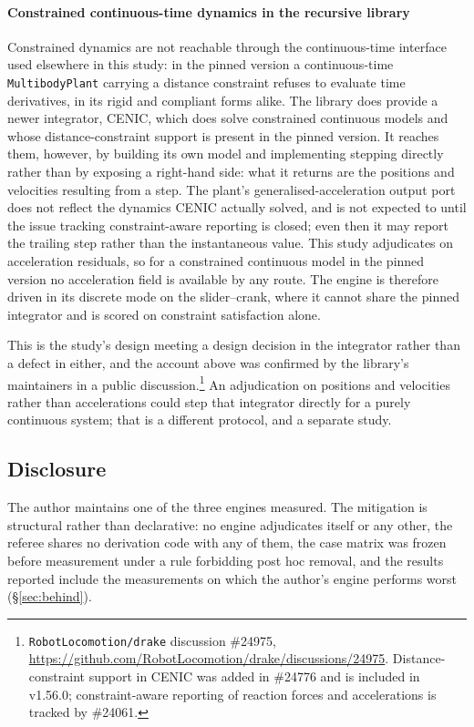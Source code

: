 \documentclass[review,12pt]{elsarticle}
\begin{document}
\paragraph{Constrained continuous-time dynamics in the recursive library}
Constrained dynamics are not reachable through the continuous-time interface
used elsewhere in this study: in the pinned version a continuous-time
\texttt{MultibodyPlant} carrying a distance constraint refuses to evaluate time
derivatives, in its rigid and compliant forms alike. The library does provide a
newer integrator, CENIC, which does solve constrained continuous models and
whose distance-constraint support is present in the pinned version. It reaches
them, however, by building its own model and implementing stepping directly
rather than by exposing a right-hand side: what it returns are the positions and
velocities resulting from a step. The plant's generalised-acceleration output
port does not reflect the dynamics CENIC actually solved, and is not expected to
until the issue tracking constraint-aware reporting is closed; even then it may
report the trailing step rather than the instantaneous value. This study
adjudicates on acceleration residuals, so for a constrained continuous model in
the pinned version no acceleration field is available by any route. The engine
is therefore driven in its discrete mode on the slider--crank, where it cannot
share the pinned integrator and is scored on constraint satisfaction alone.

This is the study's design meeting a design decision in the integrator rather
than a defect in either, and the account above was confirmed by the library's
maintainers in a public discussion.\footnote{\texttt{RobotLocomotion/drake}
discussion \#24975,
\url{https://github.com/RobotLocomotion/drake/discussions/24975}.
Distance-constraint support in CENIC was added in \#24776 and is included in
v1.56.0; constraint-aware reporting of reaction forces and accelerations is
tracked by \#24061.} An adjudication on positions and velocities
rather than accelerations could step that integrator directly for a purely
continuous system; that is a different protocol, and a separate study.

\subsection{Disclosure}\label{sec:disclosure-method}
The author maintains one of the three engines measured. The mitigation is
structural rather than declarative: no engine adjudicates itself or any other,
the referee shares no derivation code with any of them, the case matrix was frozen
before measurement under a rule forbidding post hoc removal, and the results
reported include the measurements on which the author's engine performs worst
(\S\ref{sec:behind}).
\end{document}
